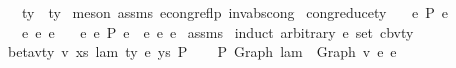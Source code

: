 \begin{isabellebody}
\ \ \ {\isachardoublequoteopen}ty{}\ {\isacharequal}{\kern0pt}\ ty{}{\isacharprime}{\kern0pt}{\isachardoublequoteclose}\isanewline
%
\isadelimproof
%
\endisadelimproof
%
\isatagproof
{}\isamarkupfalse%
\ {\isacharparenleft}{\kern0pt}meson\ assms\ econg{\isacharunderscore}{\kern0pt}reflp\ inv{\isacharunderscore}{\kern0pt}abs{\isacharunderscore}{\kern0pt}cong{}{\isacharparenright}{\kern0pt}%
\endisatagproof
{\isafoldproof}%
%
\isadelimproof
%
\endisadelimproof
%
\isadelimdocument
%
\endisadelimdocument
%
\isatagdocument
%
\isamarkuptrue%
%
\endisatagdocument
{\isafolddocument}%
%
\isadelimdocument
%
\endisadelimdocument
{}\isamarkupfalse%
\ cong{\isacharunderscore}{\kern0pt}reduce{\isacharunderscore}{\kern0pt}ty{\isacharcolon}{\kern0pt}\isanewline
\ \ \ {\isachardoublequoteopen}e{}\ {\isacharminus}{\kern0pt}{\isachargreater}{\kern0pt}{\isacharbraceleft}{\kern0pt}P{\isacharbraceright}{\kern0pt}\ e{}{\isachardoublequoteclose}\isanewline
\ \ \ {\isachardoublequoteopen}e{}\ {\isasymsimeq}e\ e{}{\isacharprime}{\kern0pt}{\isachardoublequoteclose}\isanewline
\ \ \ {\isachardoublequoteopen}{\isasymexists}e{}{\isacharprime}{\kern0pt}{\isachardot}{\kern0pt}\ e{}{\isacharprime}{\kern0pt}\ {\isacharminus}{\kern0pt}{\isachargreater}{\kern0pt}{\isacharbraceleft}{\kern0pt}P{\isacharbraceright}{\kern0pt}\ e{}{\isacharprime}{\kern0pt}\ {\isasymand}\ e{}\ {\isasymsimeq}e\ e{}{\isacharprime}{\kern0pt}{\isachardoublequoteclose}\isanewline
%
\isadelimproof
%
\endisadelimproof
%
\isatagproof
{}\isamarkupfalse%
\ assms\isanewline
{}\isamarkupfalse%
\ {\isacharparenleft}{\kern0pt}induct\ arbitrary{\isacharcolon}{\kern0pt}\ e{}{\isacharprime}{\kern0pt}\ set{\isacharcolon}{\kern0pt}\ cbv{\isacharunderscore}{\kern0pt}ty{\isacharparenright}{\kern0pt}\isanewline
\ \ \isamarkupfalse%
\ {\isacharparenleft}{\kern0pt}beta{\isacharunderscore}{\kern0pt}v{\isacharunderscore}{\kern0pt}ty\ v\ xs\ lam\ ty\ e\ ys\ P{\isacharparenright}{\kern0pt}\isanewline
\ \ \isamarkupfalse%
\ P{}{\isacharcolon}{\kern0pt}\ {\isachardoublequoteopen}Graph\ lam\ {\isasymcdot}\ Graph\ v\ {\isasymsimeq}e\ e{}{\isacharprime}{\kern0pt}{\isachardoublequoteclose}\isanewline
\ \ \ \ \isamarkupfalse%

\end{isabellebody}
